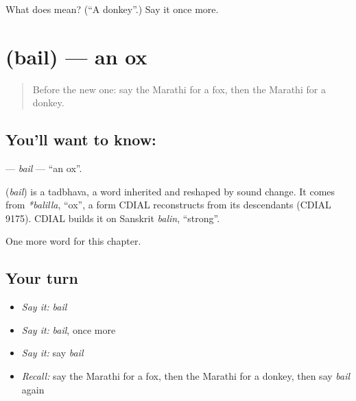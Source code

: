 \begin{tcolorbox}[breakable,colback=teal!4,colframe=teal!35!black,title={Before you move on}]
What does  mean? (\textquotedblleft{}A donkey\textquotedblright{}.) Say it once more.
\end{tcolorbox}
\section[\texorpdfstring{\mr{बैल} (bail)}{बैल (bail)}]{ (bail) — an ox}

\label{lesson:MR-C144-bail}



\begin{quote}
Before the new one: say the Marathi for a fox, then the Marathi for a donkey.
\end{quote}

\subsection*{You'll want to know: }
\textbf{} — \emph{bail} — \textquotedblleft{}an ox\textquotedblright{}.

\begin{cousinweb}
\textbf{} (\emph{bail}) is a tadbhava, a word inherited and reshaped by sound change. It comes from \emph{*balilla}, \textquotedblleft{}ox\textquotedblright{}, a form CDIAL reconstructs from its descendants (CDIAL 9175). CDIAL builds it on Sanskrit \emph{balin}, \textquotedblleft{}strong\textquotedblright{}.
\end{cousinweb}

\begin{grammarlens}[title={What you've built}]
One more word for this chapter.
\end{grammarlens}

\subsection*{Your turn}
\begin{itemize}
\raggedright
  \item \emph{Say it:} \emph{bail}
  \item \emph{Say it:} \emph{bail}, once more
  \item \emph{Say it:} say \emph{bail}
  \item \emph{Recall:} say the Marathi for a fox, then the Marathi for a donkey, then say \emph{bail} again
\end{itemize}

